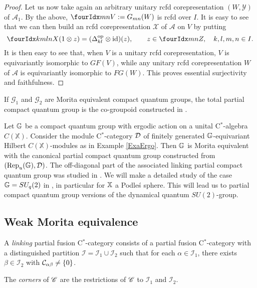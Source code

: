 \begin{proof}
Let us now take again an arbitrary unitary rcfd corepresentation $(W,\mathscr{Y})$ of $\mathscr{A}_1$. By the above, $\Gru{V}{m}{n} := G_{mn}(W)$ is rcfd over $I$. It is easy to see that we can then build an rcfd corepresentation $\mathscr{X}$ of $\mathscr{A}$ on $V$ by putting \[\Gr{X}{k}{l}{m}{n}(1\otimes z) = (\Delta_{kl}^{\op}\otimes \id)(z),\qquad z\in \Gru{Z}{m}{n}, \quad k,l,m,n\in I.\] It is then easy to see that, when $V$ is a unitary rcfd corepresentation, $V$ is equivariantly isomorphic to $GF(V)$, while any unitary rcfd corepresentation $W$ of $\mathscr{A}$ is equivariantly isomorphic to $FG(W)$. This proves essential surjectivity and faithfulness.
\end{proof}

\begin{Exa} If $\mathscr{G}_1$ and $\mathscr{G}_2$ are Morita equivalent compact quantum groups, the total partial compact quantum group is the co-groupoid constructed in \cite{Bic1}. 
\end{Exa}

\begin{Exa}  Let $\mathbb{G}$ be a compact quantum group with ergodic action on a unital C$^*$-algebra $C(\mathbb{X})$. Consider the module C$^*$-category $\mathcal{D}$ of finitely generated $\mathbb{G}$-equivariant Hilbert $C(\mathbb{X})$-modules as in Example \ref{ExaErgo}. Then $\mathbb{G}$ is Morita equivalent with the canonical partial compact quantum group constructed from $(\mathrm{Rep}_u(\mathbb{G}),\mathcal{D})$. The off-diagonal part of the associated linking partial compact quantum group was studied in \cite{DCY1}. We will make a detailed study of the case $\mathbb{G} = SU_q(2)$ in \cite{DCT2}, in particular for $\mathbb{X}$ a Podle\'{s} sphere. This will lead us to partial compact quantum group versions of the dynamical quantum $SU(2)$-group.
\end{Exa}


\subsection{Weak Morita equivalence}

\begin{Def} A \emph{linking} partial fusion C$^*$-category consists of a partial fusion C$^*$-category with a distinguished partition $\mathscr{I} =\mathscr{I}_1 \cup \mathscr{I}_2$ such that for each $\alpha\in \mathscr{I}_1$, there exists $\beta \in \mathscr{I}_{2}$ with $\mathcal{C}_{\alpha\beta}\neq \{0\}$.

The \emph{corners} of $\mathscr{C}$ are the restrictions of $\mathscr{C}$ to $\mathscr{I}_1$ and $\mathscr{I}_2$.
\end{Def}

